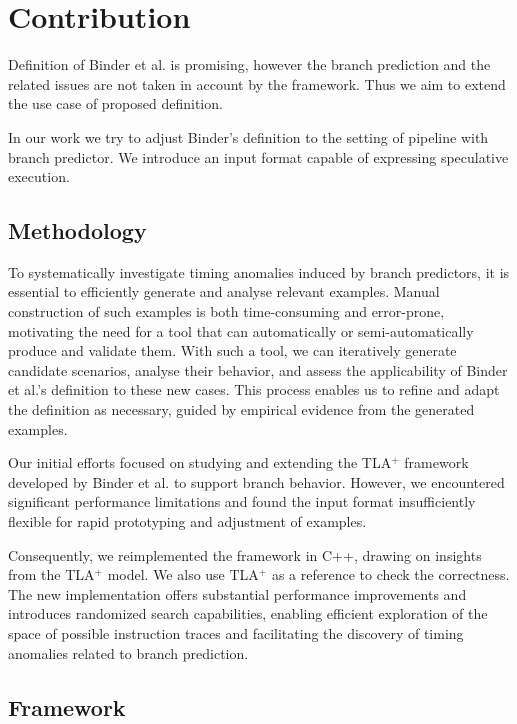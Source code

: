 \chapter{Contribution}

Definition of Binder et al. \cite{binder_definitions_2022} is promising, however the branch prediction and the related issues are not taken in account by the framework. Thus we aim to extend the use case of proposed definition.

In our work we try to adjust Binder's definition to the setting of pipeline with branch predictor. We introduce an input format capable of expressing speculative execution. 


\section{Methodology}
To systematically investigate timing anomalies induced by branch predictors, it is essential to efficiently generate and analyse relevant examples. Manual construction of such examples is both time-consuming and error-prone, motivating the need for a tool that can automatically or semi-automatically produce and validate them. With such a tool, we can iteratively generate candidate scenarios, analyse their behavior, and assess the applicability of Binder et al.'s definition to these new cases. This process enables us to refine and adapt the definition as necessary, guided by empirical evidence from the generated examples.

Our initial efforts focused on studying and extending the TLA$^+$ \cite{lamport_specifying_2003} framework developed by Binder et al.  to support branch behavior. However, we encountered significant performance limitations and found the input format insufficiently flexible for rapid prototyping and adjustment of examples.

Consequently, we reimplemented the framework in C++, drawing on insights from the TLA$^+$ model. We also use TLA$^+$ as a reference to check the correctness. The new implementation offers substantial performance improvements and introduces randomized search capabilities, enabling efficient exploration of the space of possible instruction traces and facilitating the discovery of timing anomalies related to branch prediction.

\section{Framework}

